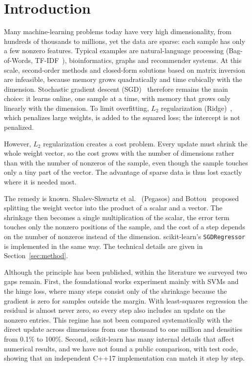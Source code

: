 \documentclass[10pt,a4paper,twocolumn]{article}
\newcommand{\sk}{\texttt{SGDRegressor}}
\begin{document}
\section{Introduction}
Many machine-learning problems today have very high dimensionality, from hundreds of thousands to millions, yet the data are sparse: each sample has only a few nonzero features. Typical examples are natural-language processing (Bag-of-Words, TF-IDF~\cite{salton}), bioinformatics, graphs and recommender systems. At this scale, second-order methods and closed-form solutions based on matrix inversion are infeasible, because memory grows quadratically and time cubically with the dimension. Stochastic gradient descent (SGD)~\cite{robbins} therefore remains the main choice: it learns online, one sample at a time, with memory that grows only linearly with the dimension. To limit overfitting, $L_2$ regularization (Ridge)~\cite{hoerl}, which penalizes large weights, is added to the squared loss; the intercept is not penalized.

However, $L_2$ regularization creates a cost problem. Every update must shrink the whole weight vector, so the cost grows with the number of dimensions rather than with the number of nonzeros of the sample, even though the sample touches only a tiny part of the vector. The advantage of sparse data is thus lost exactly where it is needed most.

The remedy is known. Shalev-Shwartz et al.~\cite{pegasos} (Pegasos) and Bottou~\cite{bottou} proposed splitting the weight vector into the product of a scalar and a vector. The shrinkage then becomes a single multiplication of the scalar, the error term touches only the nonzero positions of the sample, and the cost of a step depends on the number of nonzeros instead of the dimension. scikit-learn's \sk{}~\cite{sklearn} is implemented in the same way. The technical details are given in Section~\ref{sec:method}.

Although the principle has been published, within the literature we surveyed two gaps remain. First, the foundational works experiment mainly with SVMs and the hinge loss, where many steps consist only of the shrinkage because the gradient is zero for samples outside the margin. With least-squares regression the residual is almost never zero, so every step also includes an update on the nonzero entries. This regime has not been compared systematically with the direct update across dimensions from one thousand to one million and densities from 0.1\% to 100\%. Second, scikit-learn has many internal details that affect numerical results, and we have not found a public comparison, with test code, showing that an independent C++17 implementation can match it step by step.
\end{document}

